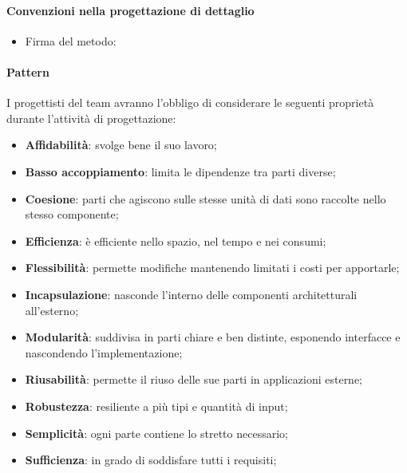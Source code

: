 \documentclass[10pt, a4paper]{article}
\begin{document}
\paragraph{Convenzioni nella progettazione di dettaglio}
\begin{itemize}
    \item Firma del metodo: \\
\end{itemize}

\paragraph{Pattern}

I progettisti del team avranno l'obbligo di considerare le seguenti proprietà durante l'attività di progettazione:
\begin{itemize}
    \item \textbf{Affidabilità}: svolge bene il suo lavoro;
    \item \textbf{Basso accoppiamento}: limita le dipendenze tra parti diverse;
    \item \textbf{Coesione}: parti che agiscono sulle stesse unità di dati sono raccolte nello stesso componente;
    \item \textbf{Efficienza}: è efficiente nello spazio, nel tempo e nei consumi;
    \item \textbf{Flessibilità}: permette modifiche mantenendo limitati i costi per apportarle;
    \item \textbf{Incapsulazione}: nasconde l'interno delle componenti architetturali all'esterno;
    \item \textbf{Modularità}: suddivisa in parti chiare e ben distinte, esponendo interfacce e nascondendo l'implementazione;
    \item \textbf{Riusabilità}: permette il riuso delle sue parti in applicazioni esterne;
    \item \textbf{Robustezza}: resiliente a più tipi e quantità di input;
    \item \textbf{Semplicità}: ogni parte contiene lo stretto necessario;
    \item \textbf{Sufficienza}: in grado di soddisfare tutti i requisiti;
\end{itemize}
\end{document}
